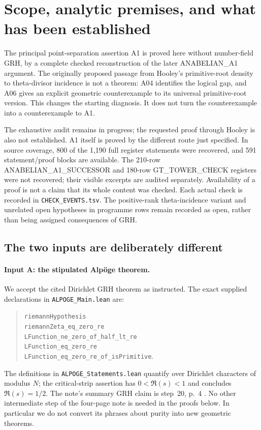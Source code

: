 \section{Scope, analytic premises, and what has been established}
\label{sec:premises}

The principal point-separation assertion A1 is proved here without
number-field GRH, by a complete checked reconstruction of the later
ANABELIAN\_A1 argument. The originally proposed passage from Hooley's
primitive-root density to theta-divisor incidence is not a theorem:
A04 identifies the logical gap, and A06 gives an explicit geometric
counterexample to its universal primitive-root version. This changes
the starting diagnosis. It does not turn the counterexample into a
counterexample to A1.

The exhaustive audit remains in progress; the
requested proof through Hooley is also not established. A1 itself
is proved by the different route just specified. In source coverage,
800 of the 1,190 full register statements were recovered, and 591
statement/proof blocks are available. The 210-row
ANABELIAN\_A1\_SUCCESSOR and 180-row GT\_TOWER\_CHECK registers were not
recovered; their visible excerpts are audited separately. Availability
of a proof is not a claim that its whole content was checked. Each
actual check is recorded in \texttt{CHECK\_EVENTS.tsv}. The positive-rank
theta-incidence variant and unrelated open hypotheses in programme
rows remain recorded as open, rather than being assigned consequences
of GRH.

\subsection{The two inputs are deliberately different}

\paragraph{Input A: the stipulated Alp\"oge theorem.}
We accept the cited Dirichlet GRH theorem as instructed. The exact
supplied declarations in \texttt{ALPOGE\_Main.lean} are:
\begin{quote}\small\raggedright
\texttt{riemannHypothesis}\\
\texttt{riemannZeta\_eq\_zero\_re}\\
\texttt{LFunction\_ne\_zero\_of\_half\_lt\_re}\\
\texttt{LFunction\_eq\_zero\_re}\\
\texttt{LFunction\_eq\_zero\_re\_of\_isPrimitive}.
\end{quote}
The definitions in \texttt{ALPOGE\_Statements.lean} quantify over
Dirichlet characters of modulus $N$; the critical-strip assertion
has $0<\Re(s)<1$ and concludes $\Re(s)=1/2$.
The note's summary GRH claim is step~20, p.~4 \cite{Alpoge}.
No other intermediate step of the four-page note is needed in the
proofs below. In particular we do not convert its phrases about
purity into new geometric theorems.

